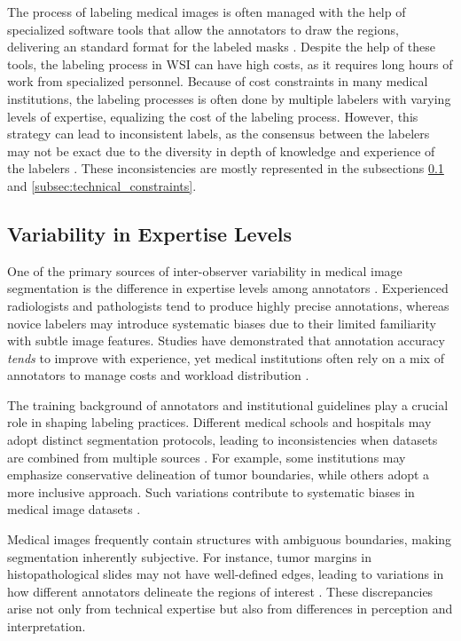 The process of labeling medical images is often managed with the help of
specialized software tools that allow the annotators to draw the
regions, delivering an standard format for the labeled
masks \cite{Habis2024}.
Despite the help of these tools, the labeling process in \gls{WSI} can have high
costs, as it requires long hours of work from specialized personnel.
Because of cost constraints in many medical institutions, the labeling processes
is often done by multiple labelers with varying levels of expertise, equalizing
the cost of the labeling process. However, this strategy can lead to
inconsistent labels, as the consensus between the labelers may not be
exact due to the diversity in depth of knowledge and experience of
the labelers \cite{XuYan2024}.
These inconsistencies are mostly represented in the subsections
\ref{subsec:expertise_levels} and \ref{subsec:technical_constraints}.

\subsection{Variability in Expertise Levels}\label{subsec:expertise_levels}

One of the primary sources of inter-observer variability in medical
image segmentation is the difference in expertise levels among
annotators \cite{Lopez2023}. Experienced radiologists and
pathologists tend to produce highly precise annotations, whereas
novice labelers may introduce systematic biases due to their limited
familiarity with subtle image features. Studies have demonstrated
that annotation accuracy \textit{tends} to improve with experience, yet medical
institutions often rely on a mix of annotators to manage costs and
workload distribution \cite{LuEtAl2023}.

The training background of annotators and institutional guidelines
play a crucial role in shaping labeling practices. Different medical
schools and hospitals may adopt distinct segmentation protocols,
leading to inconsistencies when datasets are combined from multiple
sources \cite{Lopez2023}. For example, some institutions may emphasize
conservative delineation of tumor boundaries, while others adopt a
more inclusive approach. Such variations contribute to systematic
biases in medical image datasets \cite{BanerjeeEtAl2025}.

Medical images frequently contain structures with ambiguous
boundaries, making segmentation inherently subjective. For instance,
tumor margins in histopathological slides may not have well-defined
edges, leading to variations in how different annotators delineate
the regions of interest \cite{Carmo2025}. These discrepancies arise not only
from technical expertise but also from differences in perception and
interpretation.

